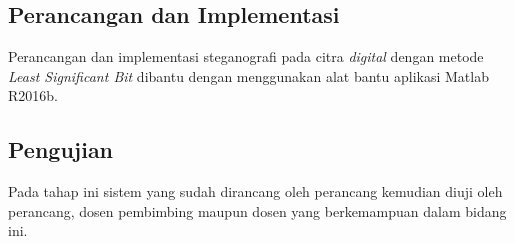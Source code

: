 	\subsection{Perancangan dan Implementasi}
	Perancangan dan implementasi steganografi pada citra \emph{digital} dengan metode \emph{Least Significant Bit} dibantu dengan menggunakan alat bantu aplikasi Matlab R2016b.
	\subsection{Pengujian}
	Pada tahap ini sistem yang sudah dirancang oleh perancang kemudian diuji oleh perancang, dosen pembimbing maupun dosen yang berkemampuan dalam bidang ini.